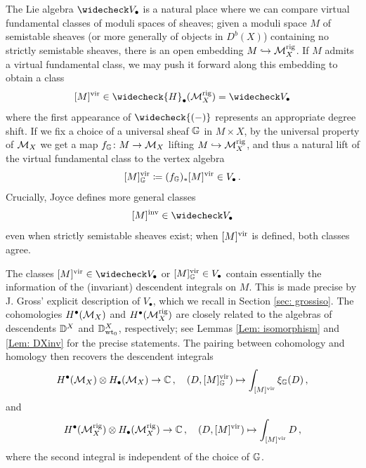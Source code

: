 \documentclass[a4paper, 12pt]{amsart}
\begin{document}
The Lie algebra $\widecheck V_\bullet$ is a natural place where we can compare virtual fundamental classes of moduli spaces of sheaves; given a moduli space $M$ of semistable sheaves (or more generally of objects in $D^b(X)$) containing no strictly semistable sheaves, there is an open embedding $M\hookrightarrow {\mathcal M}_X^{\mathrm{rig}}$. If $M$ admits a virtual fundamental class, we may push it forward along this embedding to obtain a class
\[[M]^\vir\in \widecheck{H}_\bullet(\CM_X^\rig)=\widecheck V_\bullet\]
where the first appearance of $\widecheck{(-)}$ represents an appropriate degree shift. If we fix a choice of a universal sheaf ${\mathbb{G}}$ in $M\times X$, by the universal property of ${\mathcal M}_X$ we get a map $f_{\mathbb{G}}\colon M\to {\mathcal M}_X$ lifting $M\hookrightarrow {\mathcal M}_X^{\mathrm{rig}}$, and thus a natural lift of the virtual fundamental class to the vertex algebra
\[[M]^{\mathrm{vir}}_{{\mathbb{G}}}\coloneqq (f_{\mathbb{G}})_\ast [M]^{\mathrm{vir}}\in V_\bullet\,.\]
Crucially, Joyce defines more general classes
\[[M]^\inva\in \widecheck V_\bullet\] 
even when strictly semistable sheaves exist; when $[M]^{\mathrm{vir}}$ is defined, both classes agree. 

The classes $[M]^\vir\in \widecheck V_\bullet$ or $[M]^{\mathrm{vir}}_{{\mathbb{G}}}\in V_\bullet$ contain essentially the information of the (invariant) descendent integrals on $M$. This is made precise by J. Gross' \cite{Gr19} explicit description of $V_\bullet$, which we recall in Section \ref{sec: grossiso}. The cohomologies $H^\bullet({\mathcal M}_X)$ and $H^\bullet({\mathcal M}_X^{\mathrm{rig}})$ are closely related to the algebras of descendents ${\mathbb{D}}^X$ and ${\mathbb{D}}^X_{{\mathrm{wt}_0}}$, respectively; see Lemmas \ref{Lem: isomorphism} and \ref{Lem: DXinv} for the precise statements. The pairing between cohomology and homology then recovers the descendent integrals
$$H^\bullet({\mathcal M}_X)\otimes H_\bullet({\mathcal M}_X)\to {\mathbb{C}}
\,,\quad (D,[M]^{\mathrm{vir}}_{{\mathbb{G}}})\mapsto \int_{[M]^{\mathrm{vir}}}\xi_{{\mathbb{G}}}(D)\,,
$$
and 
$$H^\bullet({\mathcal M}_X^{\mathrm{rig}})\otimes H_\bullet({\mathcal M}_X^{\mathrm{rig}})\to {\mathbb{C}}\,,\quad
(D,[M]^{\mathrm{vir}})\mapsto \int_{[M]^{\mathrm{vir}}}D \,,
$$
where the second integral is independent of the choice of ${\mathbb{G}}$.
\end{document}
